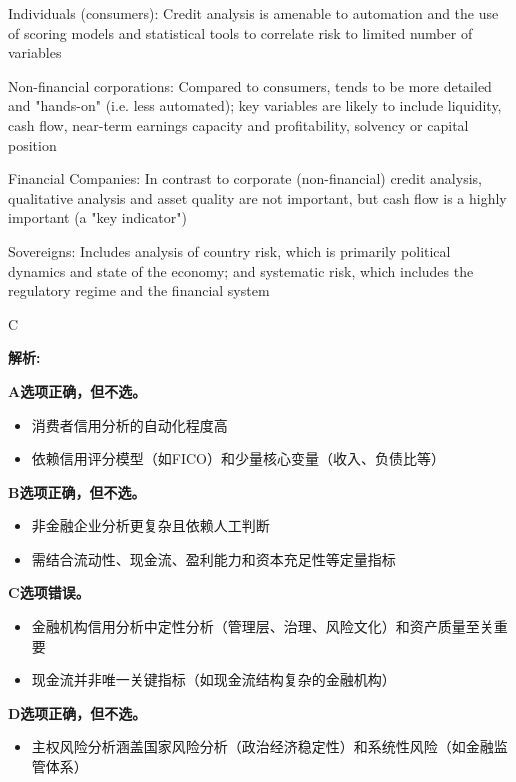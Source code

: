 \documentclass{article}
\newenvironment{explanation}
{\textbf{解析:}\par}
{\par}
\begin{document}
\begin{choices}
    \item Individuals (consumers): Credit analysis is amenable to automation and the use of scoring models and statistical tools to correlate risk to limited number of variables
    \item Non-financial corporations: Compared to consumers, tends to be more detailed and "hands-on" (i.e. less automated); key variables are likely to include liquidity, cash flow, near-term earnings capacity and profitability, solvency or capital position
    \item Financial Companies: In contrast to corporate (non-financial) credit analysis, qualitative analysis and asset quality are not important, but cash flow is a highly important (a "key indicator")
    \item Sovereigns: Includes analysis of country risk, which is primarily political dynamics and state of the economy; and systematic risk, which includes the regulatory regime and the financial system
\end{choices}

\begin{correctanswer}
    C
\end{correctanswer}

\begin{explanation}
    \textbf{A选项正确，但不选。}
    \begin{itemize}
        \item 消费者信用分析的自动化程度高
        \item 依赖信用评分模型（如FICO）和少量核心变量（收入、负债比等）
    \end{itemize}
    
    \textbf{B选项正确，但不选。}
    \begin{itemize}
        \item 非金融企业分析更复杂且依赖人工判断
        \item 需结合流动性、现金流、盈利能力和资本充足性等定量指标
    \end{itemize}
    
    \textbf{C选项错误。}
    \begin{itemize}
        \item 金融机构信用分析中定性分析（管理层、治理、风险文化）和资产质量至关重要
        \item 现金流并非唯一关键指标（如现金流结构复杂的金融机构）
    \end{itemize}
    
    \textbf{D选项正确，但不选。}
    \begin{itemize}
        \item 主权风险分析涵盖国家风险分析（政治经济稳定性）和系统性风险（如金融监管体系）
    \end{itemize}
\end{explanation}
\end{document}
